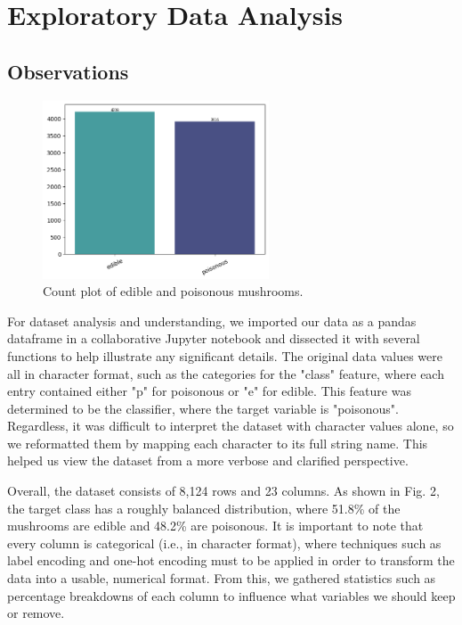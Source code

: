 \documentclass[11pt, conference]{IEEEtran}
\begin{document}
\section{Exploratory Data Analysis}
    \subsection{Observations}
    \begin{figure}[htbp]
        \centering
        \includegraphics[width=0.6\textwidth]{plot/count/class count.png}
        \caption{Count plot of edible and poisonous mushrooms.}
        \label{fig:plot2}
    \end{figure}
    For dataset analysis and understanding, we imported our data as a pandas dataframe in a collaborative Jupyter notebook and dissected it with several functions to help illustrate any significant details. The original data values were all in character format, such as the categories for the "class" feature, where each entry contained either "p" for poisonous or "e" for edible. This feature was determined to be the classifier, where the target variable is "poisonous". Regardless, it was difficult to interpret the dataset with character values alone, so we reformatted them by mapping each character to its full string name. This helped us view the dataset from a more verbose and clarified perspective.
   
    Overall, the dataset consists of 8,124 rows and 23 columns. As shown in Fig. 2, the target class has a roughly balanced distribution, where 51.8\% of the mushrooms are edible and 48.2\% are poisonous. It is important to note that every column is categorical (i.e., in character format), where techniques such as label encoding and one-hot encoding must to be applied in order to transform the data into a usable, numerical format. From this, we gathered statistics such as percentage breakdowns of each column to influence what variables we should keep or remove.
\end{document}
